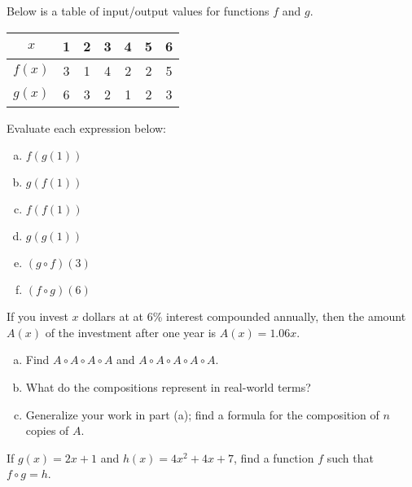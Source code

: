 \documentclass[notes]{subfiles}
\begin{document}
		\begin{ex}
			Below is a table of input/output values for functions $f$ and $g$.
			\begin{center}
				\begin{tabular}{|c||c|c|c|c|c|c|}\hline
					$x$	&	1 	&	 2	& 	3	& 	4	& 	5	& 	6 \\ \hline
					$f(x)$&	3	& 	1	& 4		& 2		& 2 		& 5\\ \hline
					$g(x)$&	6	& 	3	& 2		& 1		& 2	& 3 \\ \hline
				\end{tabular}
			\end{center}
			Evaluate each expression below:
			\begin{enumerate}[(a)]
				\item $f(g(1))$
					
				\item $g(f(1))$
					
				\item $f(f(1))$
					
				\item $g(g(1))$
					
				\item $(g\circ f)(3)$
					
				\item $(f\circ g)(6)$	
			\end{enumerate}
		\end{ex}
			\newpage
			
		\begin{ex}
			If you invest $x$ dollars at at 6\% interest compounded annually, then the amount $A(x)$ of the investment after one year is $A(x) = 1.06x$.  
			\begin{enumerate}[(a)]
				\item Find $A\circ A\circ A\circ A$ and $A\circ A\circ A\circ A\circ A$.
					\vs{1}
					
				\item What do the compositions represent in real-world terms?
					\vs{1}
					
				\item Generalize your work in part (a); find a formula for the composition of $n$ copies of $A$.
					\vs{1}
					
			\end{enumerate}
		\end{ex}
		
		\begin{ex}
			If $g(x) = 2x + 1$ and $h(x) =4x^2 + 4x + 7$, find a function $f$ such that $f\circ g = h$.
		\end{ex}
			
	\clearpage
\end{document}
